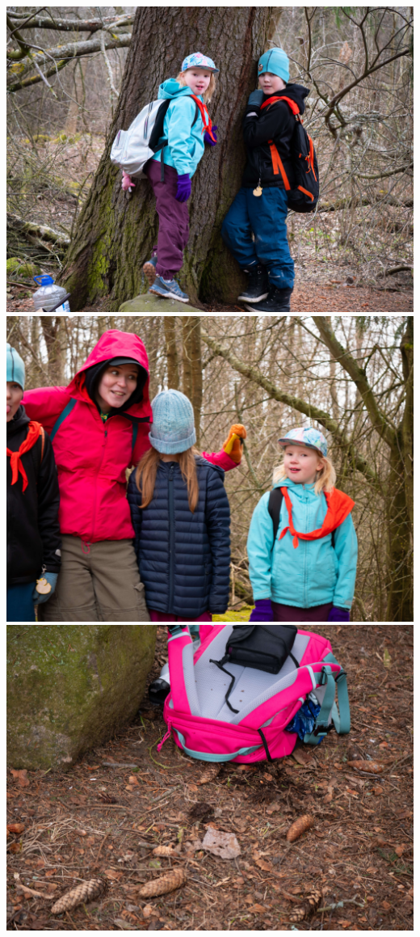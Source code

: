 \documentclass[10pt,finnish,a5paper,headings=small,twoside=semi]{scrartcl}
\begin{document}
\begin{multicols}{2}
	\noindent\includegraphics[width=0.9\linewidth]{assets/kolkkienpäiväretki7}
	\noindent\includegraphics[width=0.9\linewidth]{assets/kolkkienpäiväretki9}
	\noindent\includegraphics[width=0.9\linewidth]{assets/kolkkienpäiväretki10}

\end{multicols}
\end{document}
